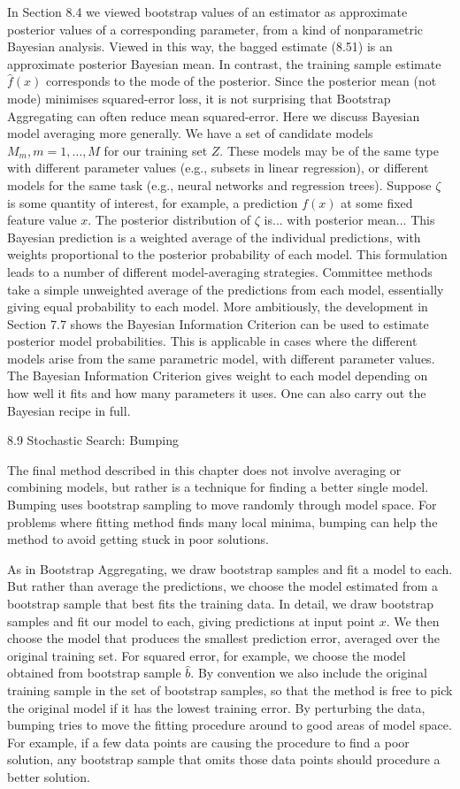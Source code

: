 In Section 8.4 we viewed bootstrap values of an estimator as approximate posterior values of a corresponding parameter, from a kind of nonparametric Bayesian analysis. Viewed in this way, the bagged estimate (8.51) is an approximate posterior Bayesian mean. In contrast, the training sample estimate $\hat{f}(x)$ corresponds to the mode of the posterior. Since the posterior mean (not mode) minimises squared-error loss, it is not surprising that Bootstrap Aggregating can often reduce mean squared-error. Here we discuss Bayesian model averaging more generally. We have a set of candidate models $M_m,m=1,\dots ,M$ for our training set $Z$. These models may be of the same type with different parameter values (e.g., subsets in linear regression), or different models for the same task (e.g., neural networks and regression trees). Suppose $\zeta$ is some quantity of interest, for example, a prediction $f(x)$ at some fixed feature value $x$. The posterior distribution of $\zeta$ is... with posterior mean... This Bayesian prediction is a weighted average of the individual predictions, with weights proportional to the posterior probability of each model. This formulation leads to a number of different model-averaging strategies. Committee methods take a simple unweighted average of the predictions from each model, essentially giving equal probability to each model. More ambitiously, the development in Section 7.7 shows the Bayesian Information Criterion can be used to estimate posterior model probabilities. This is applicable in cases where the different models arise from the same parametric model, with different parameter values. The Bayesian Information Criterion gives weight to each model depending on how well it fits and how many parameters it uses. One can also carry out the Bayesian recipe in full.

8.9 Stochastic Search: Bumping

The final method described in this chapter does not involve averaging or combining models, but rather is a technique for finding a better single model. Bumping uses bootstrap sampling to move randomly through model space. For problems where fitting method finds many local minima, bumping can help the method to avoid getting stuck in poor solutions.

As in Bootstrap Aggregating, we draw bootstrap samples and fit a model to each. But rather than average the predictions, we choose the model estimated from a bootstrap sample that best fits the training data. In detail, we draw bootstrap samples and fit our model to each, giving predictions at input point $x$. We then choose the model that produces the smallest prediction error, averaged over the original training set. For squared error, for example, we choose the model obtained from bootstrap sample $\hat{b}$. By convention we also include the original training sample in the set of bootstrap samples, so that the method is free to pick the original model if it has the lowest training error. By perturbing the data, bumping tries to move the fitting procedure around to good areas of model space. For example, if a few data points are causing the procedure to find a poor solution, any bootstrap sample that omits those data points should procedure a better solution.


